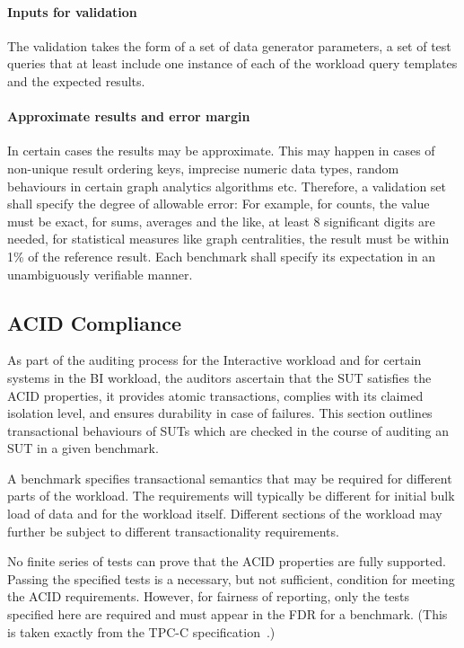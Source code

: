 \paragraph{Inputs for validation}
The validation takes the form of a set of data generator parameters, a set of test queries that at least include one instance of each of the workload query templates and the expected results.

\paragraph{Approximate results and error margin}
In certain cases the results may be approximate. This may happen in cases of non-unique result ordering keys, imprecise numeric data types, random behaviours in certain graph analytics algorithms etc. Therefore, a validation set shall specify the degree of allowable error: For example, for counts, the value must be exact, for sums, averages and the like, at least 8 significant digits are needed, for statistical measures like graph centralities, the result must be within 1\% of the reference result. Each benchmark shall specify its expectation in an unambiguously verifiable manner.

\subsection{ACID Compliance}
\label{sec:acid-compliance}

As part of the auditing process for the Interactive workload and for certain systems in the BI workload, the auditors ascertain that the SUT satisfies the ACID properties,
\ie it provides atomic transactions, complies with its claimed isolation level, and ensures durability in case of failures.
This section outlines transactional behaviours of SUTs which are checked in the course of auditing an SUT in a given benchmark.

A benchmark specifies transactional semantics that may be required for different parts of the workload. The requirements will typically be different for initial bulk load of data and for the workload itself. Different sections of the workload may further be subject to different transactionality requirements.

No finite series of tests can prove that the ACID properties are fully supported. Passing the specified tests is a necessary, but not sufficient, condition for meeting the ACID requirements. However, for fairness of reporting, only the tests specified here are required and must appear in the FDR for a benchmark. (This is taken exactly from the \mbox{TPC-C} specification~\cite{tpcc}.)

